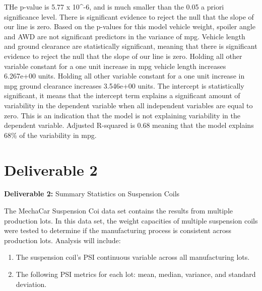 \documentclass[a4paper, 12pt]{article}\usepackage[]{graphicx}\usepackage[]{color}
\begin{document}
THe p-value is 5.77 x 10^-6, and  is much smaller than the 0.05 a priori significance level. There is significant evidence to reject the null that the slope of our line is zero. 
Based on the p-values for this model vehicle weight, spoiler angle and AWD are not significant predictors in the variance of mpg. 
Vehicle length and ground clearance are statistically significant, meaning that there is significant evidence to reject the null that the slope of our line is zero. Holding all other variable constant for a one unit increase in mpg vehicle length increases 6.267e+00 units. Holding all other variable constant for a one unit increase in mpg ground clearance increases 3.546e+00 units. 
The intercept is statistically significant, it means that the intercept term explains a significant amount of variability in the dependent variable when all independent variables are equal to zero. This is an indication that the model is not explaining variability in the dependent variable. 
Adjusted R-squared is 0.68 meaning that the model explains 68\% of the variability in mpg.  




\section{Deliverable 2}
\textbf{Deliverable 2:} Summary Statistics on Suspension Coils

The MechaCar Suspension Coi data set contains the results from multiple production lots. In this data set, the weight capacities of multiple suspension coils were tested to determine if the manufacturing process is consistent across production lots. Analysis will include:

\begin{enumerate}
\item The suspension coil’s PSI continuous variable across all manufacturing lots. 
\item The following PSI metrics for each lot: mean, median, variance, and       standard deviation. 
\end{enumerate}
\end{document}
